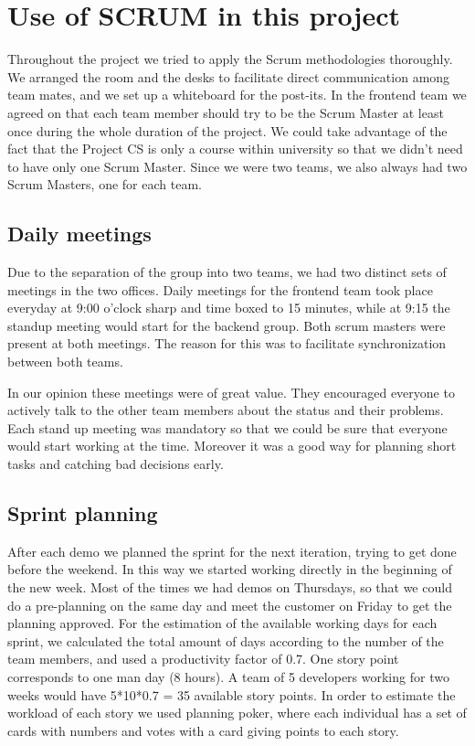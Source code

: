 \section{Use of SCRUM in this project}
Throughout the project we tried to apply the Scrum methodologies thoroughly.
We arranged the room and the desks to facilitate direct communication among team mates,
and we set up a whiteboard for the post-its. 
In the frontend team we agreed on that each team member should try to
be the Scrum Master at least once during the whole duration of the project.
We could take advantage of the fact that the Project CS is only a course within university
so that we didn't need to have only one Scrum Master.
Since we were two teams, we also always had two Scrum Masters, one for each team.

\subsection{Daily meetings}
Due to the separation of the group into two teams, we had two distinct sets of meetings in the two offices.
Daily meetings for the frontend team took place everyday at 9:00 o'clock sharp and time boxed to 15 minutes,
while at 9:15 the standup meeting would start for the backend group.
Both scrum masters were present at both meetings.
The reason for this was to facilitate synchronization between both teams.

In our opinion these meetings were of great value. 
They encouraged everyone to actively talk to the other team members about
the status and their problems.
Each stand up meeting was mandatory so that we could be sure
that everyone would start working at the time. 
Moreover it was a good way for planning short tasks and catching bad decisions early.

\subsection{Sprint planning}
After each demo we planned the sprint for the next iteration, trying to get done before the weekend.
In this way we started working directly in the beginning of the new week. Most of the times we had demos on Thursdays,
so that we could do a pre-planning on the same day and meet the customer on Friday to get the planning approved.
For the estimation of the available working days for each sprint, we calculated the total amount of days
according to the number of the team members, and used a productivity factor of 0.7. One story point corresponds to one man day (8 hours). A team of 5 developers working
for two weeks would have 5*10*0.7 = 35 available story points.
In order to estimate the workload of each story we used planning poker, where each individual has a set of cards
with numbers and votes with a card giving points to each story. 


